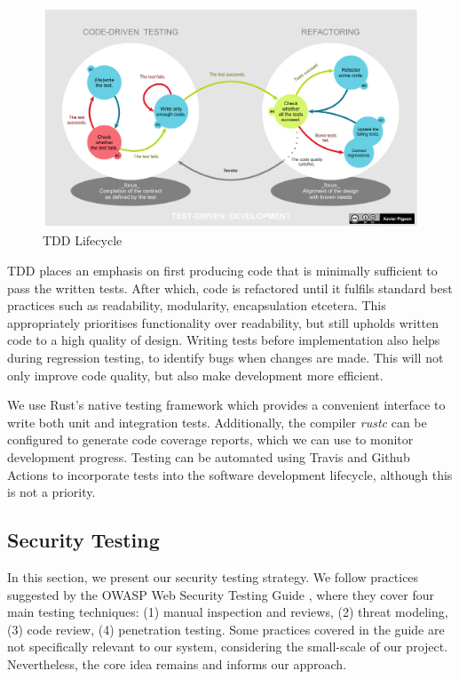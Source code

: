 \begin{figure}[h]
    \centering
    \includegraphics[width=\linewidth]{../assets/TDD_Global_Lifecycle.png}
    \caption{TDD Lifecycle \cite{Wikimedia:TDD}}
    \label{fig:tdd}
\end{figure}

TDD places an emphasis on first producing code that is minimally sufficient to pass the written tests. After which, code is refactored until it fulfils standard best practices such as readability, modularity, encapsulation etcetera. This appropriately prioritises functionality over readability, but still upholds written code to a high quality of design. Writing tests before implementation also helps during regression testing, to identify bugs when changes are made. This will not only improve code quality, but also make development more efficient. 

We use Rust's native testing framework which provides a convenient interface to write both unit and integration tests. Additionally, the compiler \textit{rustc} can be configured to generate code coverage reports, which we can use to monitor development progress. Testing can be automated using Travis and Github Actions to incorporate tests into the software development lifecycle, although this is not a priority.

\subsection{Security Testing}
\label{sec:security_testing}
In this section, we present our security testing strategy. We follow practices suggested by the OWASP Web Security Testing Guide \cite{OWASPv4.2}, where they cover four main testing techniques: (1) manual inspection and reviews, (2) threat modeling, (3) code review, (4) penetration testing. Some practices covered in the guide are not specifically relevant to our system, considering the small-scale of our project. Nevertheless, the core idea remains and informs our approach.

